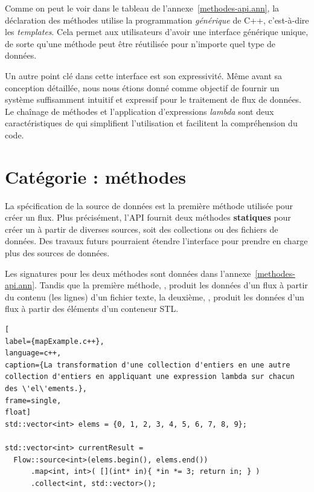 Comme on peut le voir dans le tableau de l'annexe~\ref{methodes-api.ann}, la d\'eclaration des m\'ethodes utilise la programmation \emph{g\'en\'erique} de C++, c'est-\`a-dire les \emph{templates}. Cela permet aux utilisateurs d'avoir une interface g\'en\'erique unique, de sorte qu'une m\'ethode peut \^etre r\'eutilis\'ee pour n'importe quel type de donn\'ees.


Un autre point cl\'e dans cette interface est son expressivit\'e. M\^eme avant sa conception d\'etaill\'ee, nous nous \'etions donn\'e comme objectif de fournir un syst\`eme suffisamment intuitif et expressif pour le traitement de flux de donn\'ees. Le cha\^inage de m\'ethodes et l'application d'expressions \emph{lambda} sont deux caract\'eristiques de  qui simplifient l'utilisation et facilitent la compr\'ehension du code.


\section{Cat\'egorie  : m\'ethodes }

\label{source.sect}

La sp\'ecification de la source de donn\'ees est la premi\`ere m\'ethode utilis\'ee pour cr\'eer un flux. Plus pr\'ecis\'ement, l'API fournit deux m\'ethodes {\bf statiques} pour cr\'eer un  \`a partir de diverses sources, soit des collections ou des fichiers de donn\'ees. Des travaux futurs pourraient \'etendre l'interface pour prendre en charge plus des sources de donn\'ees.

Les signatures pour les deux m\'ethodes sont donn\'ees dans l'annexe~\ref{methodes-api.ann}. Tandis que la premi\`ere m\'ethode, , produit les donn\'ees d'un flux \`a partir du contenu (les lignes) d'un fichier texte, la deuxi\`eme, , produit les donn\'ees d'un flux \`a partir des \'el\'ements d'un conteneur STL.

\begin{lstlisting}[
label={mapExample.c++},
language=c++,
caption={La transformation d'une collection d'entiers en une autre collection d'entiers en appliquant une expression lambda sur chacun des \'el\'ements.},
frame=single,
float]
std::vector<int> elems = {0, 1, 2, 3, 4, 5, 6, 7, 8, 9};

std::vector<int> currentResult =
  Flow::source<int>(elems.begin(), elems.end())
      .map<int, int>( [](int* in){ *in *= 3; return in; } )
      .collect<int, std::vector>();            
\end{lstlisting}

